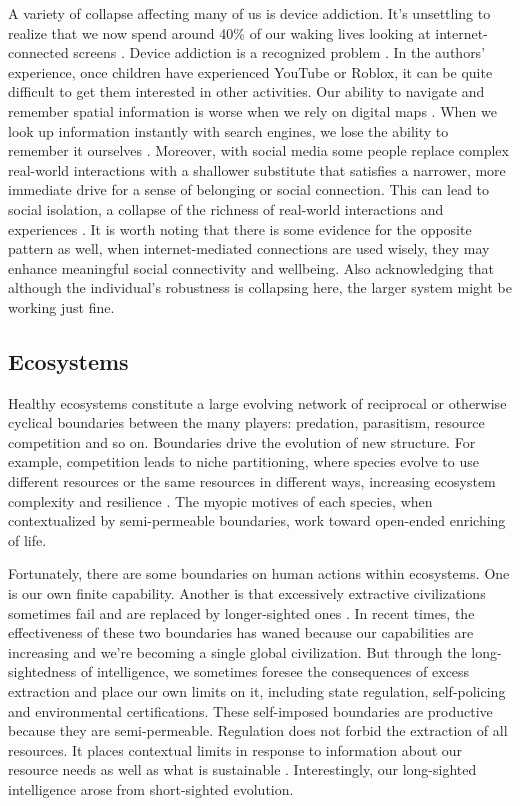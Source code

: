 A variety of collapse affecting many of us is device addiction. It's unsettling to realize that we now spend around 40\% of our waking lives looking at internet-connected screens \citep{binns2024screen}. Device addiction is a recognized problem \citep{ratan2021smartphone}. In the authors' experience, once children have experienced YouTube or Roblox, it can be quite difficult to get them interested in other activities. Our ability to navigate and remember spatial information is worse when we rely on digital maps \citep{brugger2019does}. When we look up information instantly with search engines, we lose the ability to remember it ourselves \citep{sparrow2011google}. Moreover, with social media some people replace complex real-world interactions with a shallower substitute that satisfies a narrower, more immediate drive for a sense of belonging or social connection. This can lead to social isolation, a collapse of the richness of real-world interactions and experiences \citep{mccrae2017social, nowland2018loneliness, primack2017social}. It is worth noting that there is some evidence for the opposite pattern as well, when internet-mediated connections are used wisely, they may enhance meaningful social connectivity and wellbeing. Also acknowledging that although the individual's robustness is collapsing here, the larger system might be working just fine. 


\subsection{Ecosystems}


Healthy ecosystems constitute a large evolving network of reciprocal or otherwise cyclical boundaries between the many players: predation, parasitism, resource competition and so on. Boundaries drive the evolution of new structure. For example, competition leads to niche partitioning, where species evolve to use different resources or the same resources in different ways, increasing ecosystem complexity and resilience \citep{schoener1974resource}. The myopic motives of each species, when contextualized by semi-permeable boundaries, work toward open-ended enriching of life.


Fortunately, there are some boundaries on human actions within ecosystems. One is our own finite capability. Another is that excessively extractive civilizations sometimes fail and are replaced by longer-sighted ones \citep{diamond2004collapse}. In recent times, the effectiveness of these two boundaries has waned because our capabilities are increasing and we're becoming a single global civilization. But through the long-sightedness of intelligence, we sometimes foresee the consequences of excess extraction and place our own limits on it, including state regulation, self-policing and environmental certifications. These self-imposed boundaries are productive because they are semi-permeable. Regulation does not forbid the extraction of all resources. It places contextual limits in response to information about our resource needs as well as what is sustainable \citep{lazarus2023making}. Interestingly, our long-sighted intelligence arose from short-sighted evolution. 

